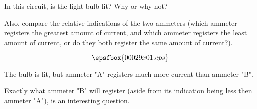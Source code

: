 

In this circuit, is the light bulb lit?  Why or why not?

Also, compare the relative indications of the two ammeters (which ammeter registers the greatest amount of current, and which ammeter registers the least amount of current, or do they both register the same amount of current?).

$$\epsfbox{00029x01.eps}$$







The bulb is lit, but ammeter "A" registers much more current than ammeter "B".







Exactly what ammeter "B" will register (aside from its indication being less then ammeter "A"), is an interesting question.  




